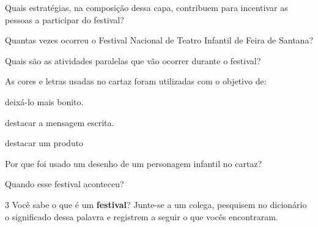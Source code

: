 \begin{escolha}
\item Quais estratégias, na composição dessa capa, contribuem para
incentivar as pessoas a participar do festival?


\item Quantas vezes ocorreu o Festival Nacional de Teatro Infantil de
Feira de Santana?


\item Quais são as atividades paralelas que vão ocorrer durante o festival?


\item As cores e letras usadas no cartaz foram utilizadas com o objetivo de:

\begin{boxlist}
 deixá-lo mais bonito.

 destacar a mensagem escrita.

 destacar um produto
\end{boxlist}

\item Por que foi usado um desenho de um personagem infantil no cartaz?


\item Quando esse festival aconteceu? 

\end{escolha}

\num{3} Você sabe o que é um \textbf{festival}? Junte-se a um colega,
pesquisem no dicionário o significado dessa palavra e registrem a seguir 
o que vocês encontraram.


